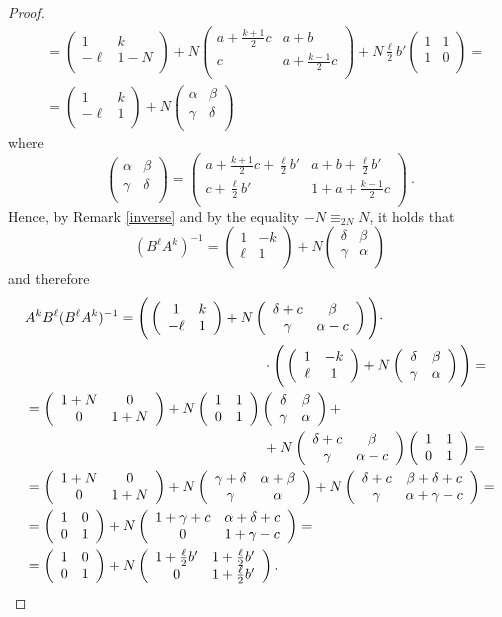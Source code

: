\documentclass[10pt]{amsart}
\theoremstyle{plain}
\theoremstyle{definition}
\theoremstyle{remark}%
\newcommand{\mat}[4]{\left(\begin{array}{cc}
 #1 & #2\\
 #3 & #4\\
\end{array}\right)}
\begin{document}
\begin{proof}
\begin{align*}
&=\mat{1}{k}{-\ell}{1-N}+
 N\mat{a+\frac{k+1}{2}c}{a+b}{c}{a+\frac{k-1}{2}c}+N\tfrac{\ell}{2}b'\mat{1}{1}{1}{0}=\\
&=\mat{1}{k}{-\ell}{1}+N
\mat{\alpha}{\beta}{\gamma}{\delta}
\end{align*}
 where $$\mat{\alpha}{\beta}{\gamma}{\delta}=\mat{a+\frac{k+1}{2}c+\frac{\ell}{2}b'}{a+b+\frac{\ell}{2}b'}{c+\frac{\ell}{2}b'}{1+a+\frac{k-1}{2}c}\ .$$
Hence, by Remark \ref{inverse} and by the equality $-N\equiv_{2N} N$, it holds that 
$$(B^\ell A^k)^{-1}=\mat{1}{-k}{\ell}{1}+
N\mat{\delta}{\beta}{\gamma}{\alpha}$$
and therefore
\begin{align*}
&A^k B^\ell(B^\ell A^k)^{-1}=\Bigg(\mat{1}{k}{-\ell}{1}+
N\mat{\delta+c}{\beta}{\gamma}{\alpha-c}\Bigg)\cdot\\
&\hspace{60mm}\cdot\Bigg(\mat{1}{-k}{\ell}{1}+
N\mat{\delta}{\beta}{\gamma}{\alpha}\Bigg)=\\
&=\mat{1+N}{0}{0}{1+N}+N\mat{1}{1}{0}{1}\mat{\delta}{\beta}{\gamma}{\alpha}+\\
&\hspace{60mm}+N\mat{\delta+c}{\beta}{\gamma}{\alpha-c}\mat{1}{1}{0}{1}=\\
&=\mat{1+N}{0}{0}{1+N}+N\mat{\gamma+\delta}{\alpha+\beta}{\gamma}{\alpha}+N\mat{\delta+c}{\beta+\delta+c}{\gamma}{\alpha+\gamma-c}=\\
&=\mat{1}{0}{0}{1}+N\mat{1+\gamma+c}{\alpha+\delta+c}{0}{1+\gamma-c}=\\
&=\mat{1}{0}{0}{1}+N\mat{1+\frac{\ell}{2}b'}{1+\frac{\ell}{2}b'}{0}{1+\frac{\ell}{2}b'} .
\end{align*}
\end{proof}
\end{document}
